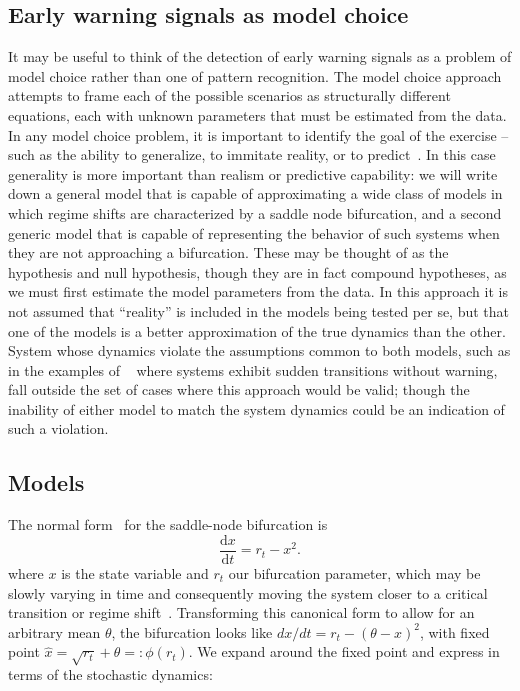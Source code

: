 \documentclass[authoryear,review,11pt]{elsarticle}
\newcommand{\ud}{\mathrm{d}}
\begin{document}
\subsection*{Early warning signals as model choice}
It may be useful to think of the detection of early warning signals 
as a problem of model choice rather than one of pattern recognition.  
The model choice approach attempts to frame each of the possible scenarios as structurally different equations,
each with unknown parameters that must be estimated from the data.
In any model choice problem, it is important to identify the goal of the exercise --
such as the ability to generalize, to immitate reality, or to predict~\citep{Levins1966}.  
In this case generality is more important than realism or predictive capability: 
we will write down a general model that is capable of approximating
a wide class of models in which regime shifts are characterized by a saddle node bifurcation,
and a second generic model that is capable of representing the behavior of such systems
when they are not approaching a bifurcation.  
These may be thought of as the hypothesis and null hypothesis,
though they are in fact compound hypotheses,
as we must first estimate the model parameters from the data.  
In this approach it is not assumed that ``reality'' is included in the models being tested per se, 
but that one of the models is a better approximation of the true dynamics than the other.  
System whose dynamics violate the assumptions common to both models, 
such as in the examples of ~\citet{Hastings2010} where systems exhibit sudden transitions without warning, 
fall outside the set of cases where this approach would be valid; 
though the inability of either model to match the system dynamics could be an indication of such a violation.  


\subsection*{Models}
The normal form~\citep{Guckenheimer1983, Kuehn2011} for the saddle-node bifurcation is
\begin{equation}
\frac{\ud x}{\ud t} = r_t- x^2.
\label{saddle-node}
\end{equation}
where $x$ is the state variable and $r_t$ our bifurcation parameter, 
which may be slowly varying in time and 
consequently moving the system closer to a critical transition or regime shift~\citep{Scheffer2009}.  
Transforming this canonical form to allow for an arbitrary mean $\theta$,
the bifurcation looks like $ dx/dt = r_t- (\theta-x)^2 $, with fixed point $\hat x = \sqrt{r_t} +\theta =: \phi(r_t)$.
We expand around the fixed point and express in terms of the stochastic dynamics: 
\end{document}
